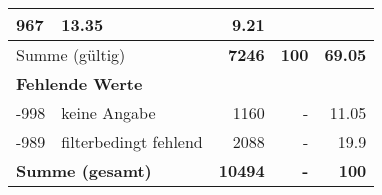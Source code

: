 \begin{longtable}{lXrrr}
       \num{967} &
       \num[round-mode=places,round-precision=2]{13.35} &
         \num[round-mode=places,round-precision=2]{9.21} \\
     \midrule
     \multicolumn{2}{l}{Summe (gültig)} &
       \textbf{\num{7246}} &
     \textbf{\num{100}} &
       \textbf{\num[round-mode=places,round-precision=2]{69.05}} \\
     \multicolumn{5}{l}{\textbf{Fehlende Werte}}\\
       -998 &
       keine Angabe &
         \num{1160} &
        - &
         \num[round-mode=places,round-precision=2]{11.05} \\
       -989 &
       filterbedingt fehlend &
         \num{2088} &
        - &
         \num[round-mode=places,round-precision=2]{19.9} \\
     \midrule
     \multicolumn{2}{l}{\textbf{Summe (gesamt)}} &
          \textbf{\num{10494}} &
        \textbf{-} &
        \textbf{\num{100}} \\
     \bottomrule
     \end{longtable}
     
